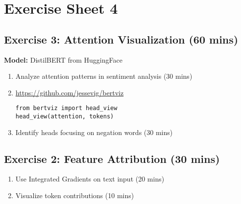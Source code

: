 \chapter*{Exercise Sheet 4}
\section*{Exercise 3: Attention Visualization (60 mins)}
\textbf{Model:} DistilBERT from HuggingFace

\begin{enumerate}
\item Analyze attention patterns in sentiment analysis (30 mins)
\item \url{https://github.com/jessevig/bertviz}
\begin{verbatim}
from bertviz import head_view
head_view(attention, tokens)
\end{verbatim}

\item Identify heads focusing on negation words (30 mins)
\end{enumerate}

\section*{Exercise 2: Feature Attribution (30 mins)}
\begin{enumerate}
\item Use Integrated Gradients on text input (20 mins)
\item Visualize token contributions (10 mins)
\end{enumerate}